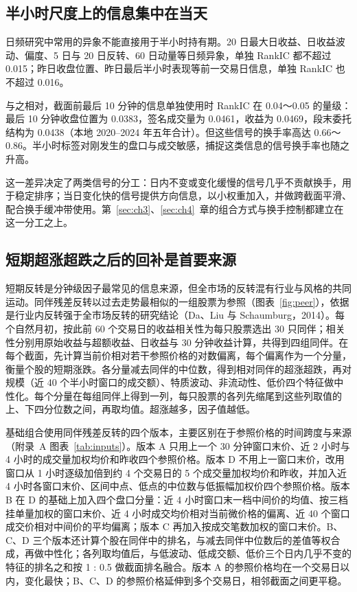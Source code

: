 \documentclass[UTF8,a4paper,zihao=-4,fontset=none]{ctexart}
\begin{document}
\subsection{半小时尺度上的信息集中在当天}\label{sec:intraday}

日频研究中常用的异象不能直接用于半小时持有期。20 日最大日收益、日收益波动、偏度、5 日与 20 日反转、60 日动量等日频异象，单独 RankIC 都不超过 0.015；昨日收盘位置、昨日最后半小时表现等前一交易日信息，单独 RankIC 也不超过 0.016。

与之相对，截面前最后 10 分钟的信息单独使用时 RankIC 在 0.04～0.05 的量级：最后 10 分钟收盘位置为 0.0383，签名成交量为 0.0461，收益为 0.0469，段末委托结构为 0.0438（本地 2020–2024 年五年合计）。但这些信号的换手率高达 0.66～0.86。半小时标签对刚发生的盘口与成交敏感，捕捉这类信息的信号换手率也随之升高。

这一差异决定了两类信号的分工：日内不变或变化缓慢的信号几乎不贡献换手，用于稳定排序；当日变化快的信号提供方向信息，以小权重加入，并做跨截面平滑、配合换手缓冲带使用。第~\ref{sec:ch3}、\ref{sec:ch4}~章的组合方式与换手控制都建立在这一分工之上。

\subsection{短期超涨超跌之后的回补是首要来源}\label{sec:reversal}

短期反转是分钟级因子最常见的信息来源，但全市场的反转混有行业与风格的共同运动。同伴残差反转以过去走势最相似的一组股票为参照（图表~\ref{fig:peer}），依据是行业内反转强于全市场反转的研究结论（Da、Liu 与 Schaumburg，2014）。每个自然月初，按此前 60 个交易日的收益相关性为每只股票选出 30 只同伴；相关性分别用原始收益与超额收益、日收益与 30 分钟收益计算，共得到四组同伴。在每个截面，先计算当前价相对若干参照价格的对数偏离，每个偏离作为一个分量，衡量个股的短期涨跌。各分量减去同伴的中位数，得到相对同伴的超涨超跌，再对规模（近 40 个半小时窗口的成交额）、特质波动、非流动性、低价四个特征做中性化。每个分量在每组同伴上得到一列，每只股票的各列先缩尾到这些列取值的上、下四分位数之间，再取均值。超涨越多，因子值越低。

基础组合使用同伴残差反转的四个版本，主要区别在于参照价格的时间跨度与来源（附录~A 图表~\ref{tab:inputs}）。版本 A 只用上一个 30 分钟窗口末价、近 2 小时与 4 小时的成交量加权均价和昨收四个参照价格。版本 D 不用上一窗口末价，改用窗口从 1 小时逐级加倍到约 4 个交易日的 5 个成交量加权均价和昨收，并加入近 4 小时各窗口末价、区间中点、低点的中位数与低振幅加权价四个参照价格。版本 B 在 D 的基础上加入四个盘口分量：近 4 小时窗口末一档中间价的均值、按三档挂单量加权的窗口末价、近 4 小时成交均价相对当前微价格的偏离、近 40 个窗口成交价相对中间价的平均偏离；版本 C 再加入按成交笔数加权的窗口末价。B、C、D 三个版本还计算个股在同伴中的排名，与减去同伴中位数后的差值等权合成，再做中性化；各列取均值后，与低波动、低成交额、低价三个日内几乎不变的特征的排名之和按 1 : 0.5 做截面排名融合。版本 A 的参照价格均在一个交易日以内，变化最快；B、C、D 的参照价格延伸到多个交易日，相邻截面之间更平稳。
\end{document}
